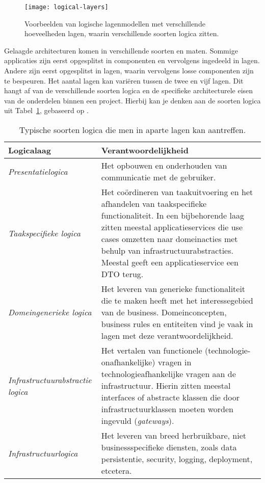 \begin{figure}[H]
    \centering
    \texttt{[image: logical-layers]}
    \caption{Voorbeelden van logische lagenmodellen met verschillende hoeveelheden lagen, waarin 
    verschillende soorten logica zitten.}
    \label{fig:logical-layers}
\end{figure}

Gelaagde architecturen komen in verschillende soorten en maten. Sommige applicaties 
zijn eerst opgesplitst in componenten en vervolgens ingedeeld in lagen. Andere zijn 
eerst opgesplitst in lagen, waarin vervolgens losse componenten zijn te bespeuren.
Het aantal lagen kan variëren tussen de twee en vijf lagen. Dit hangt af 
van de verschillende soorten logica en de specifieke architecturele eisen
van de onderdelen binnen een project. Hierbij kan je denken aan de soorten 
logica uit Tabel~\ref{table:logica-in-lagen}, gebaseerd op \cite{Pruijt2010}.

\begin{table}[H]
\centering
\begin{tabularx}{\textwidth}{|>{\raggedright}l|>{\raggedright\arraybackslash}X|}
\hline
\textbf{Logicalaag} 
    & \textbf{Verantwoordelijkheid} \\
\hline
\textit{Presentatielogica}
    & Het opbouwen en onderhouden van communicatie 
    met de gebruiker. \\ 
\hline
\textit{Taakspecifieke logica} 
    & Het coördineren van taakuitvoering en 
    het afhandelen van taakspecifieke functionaliteit. 
    In een bijbehorende laag zitten meestal applicatieservices die use cases 
    omzetten naar domeinacties met behulp van infrastructuurabstracties.
    Meestal geeft een applicatieservice een DTO terug. \\
\hline
\textit{Domeingenerieke logica}
    & Het leveren van generieke functionaliteit die te maken heeft 
    met het interessegebied van de business. 
    Domeinconcepten, business rules en entiteiten vind je vaak in lagen 
    met deze verantwoordelijkheid. \\
\hline
\textit{Infrastructuurabstractie logica}
    & Het vertalen van functionele (technologie-onafhankelijke) 
    vragen in technologieafhankelijke vragen aan de infrastructuur. 
    Hierin zitten meestal interfaces of abstracte klassen die door
    infrastructuurklassen moeten worden ingevuld (\emph{gateways}). \\
\hline
\textit{Infrastructuurlogica}
    & Het leveren van breed herbruikbare, niet businessspecifieke diensten, 
    zoals data persistentie, security, logging, deployment, etcetera. \\
\hline
\end{tabularx}
\caption{Typische soorten logica die men in aparte lagen kan aantreffen.}
\label{table:logica-in-lagen}
\centering
\end{table}

